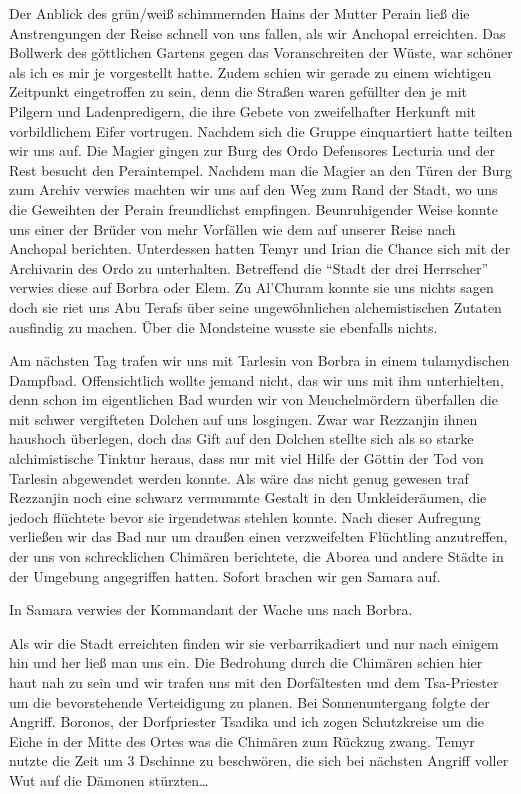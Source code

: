 Der Anblick des grün/weiß schimmernden Hains der Mutter Perain ließ die Anstrengungen der Reise schnell von uns fallen, als wir Anchopal erreichten. Das Bollwerk des göttlichen Gartens gegen das Voranschreiten der Wüste, war schöner als ich es mir je vorgestellt hatte. Zudem schien wir gerade zu einem wichtigen Zeitpunkt eingetroffen zu sein, denn die Straßen waren gefüllter den je mit Pilgern und Ladenpredigern, die ihre Gebete von zweifelhafter Herkunft mit vorbildlichem Eifer vortrugen. Nachdem sich die Gruppe einquartiert hatte teilten wir uns auf. Die Magier gingen zur Burg des Ordo Defensores Lecturia und der Rest besucht den Peraintempel. Nachdem man die Magier an den Türen der Burg zum Archiv verwies machten wir uns auf den Weg zum Rand der Stadt, wo uns die Geweihten der Perain freundlichst empfingen. Beunruhigender Weise konnte uns einer der Brüder von mehr Vorfällen wie dem auf unserer Reise nach Anchopal berichten. Unterdessen hatten Temyr und Irian die Chance sich mit der Archivarin des Ordo zu unterhalten. Betreffend die ``Stadt der drei Herrscher'' verwies diese auf Borbra oder Elem. Zu Al'Churam konnte sie uns nichts sagen doch sie riet uns Abu Terafs über seine ungewöhnlichen alchemistischen Zutaten ausfindig zu machen. Über die Mondsteine wusste sie ebenfalls nichts.

Am nächsten Tag trafen wir uns mit Tarlesin von Borbra in einem tulamydischen Dampfbad. Offensichtlich wollte jemand nicht, das wir uns mit ihm unterhielten, denn schon im eigentlichen Bad wurden wir von Meuchelmördern überfallen die mit schwer vergifteten Dolchen auf uns losgingen. Zwar war Rezzanjin ihnen haushoch überlegen, doch das Gift auf den Dolchen stellte sich als so starke alchimistische Tinktur heraus, dass nur mit viel Hilfe der Göttin der Tod von Tarlesin abgewendet werden konnte. Als wäre das nicht genug gewesen traf Rezzanjin noch eine schwarz vermummte Gestalt in den Umkleideräumen, die jedoch flüchtete bevor sie irgendetwas stehlen konnte. Nach dieser Aufregung verließen wir das Bad nur um draußen einen verzweifelten Flüchtling anzutreffen, der uns von schrecklichen Chimären berichtete, die Aborea und andere Städte in der Umgebung angegriffen hatten. Sofort brachen wir gen Samara auf.

In Samara verwies der Kommandant der Wache uns nach Borbra.

Als wir die Stadt erreichten finden wir sie verbarrikadiert und nur nach einigem hin und her ließ man uns ein. Die Bedrohung durch die Chimären schien hier haut nah zu sein und wir trafen uns mit den Dorfältesten und dem Tsa-Priester um die bevorstehende Verteidigung zu planen. Bei Sonnenuntergang folgte der Angriff. Boronos, der Dorfpriester Tsadika und ich zogen Schutzkreise um die Eiche in der Mitte des Ortes was die Chimären zum Rückzug zwang. Temyr nutzte die Zeit um 3 Dschinne zu beschwören, die sich bei nächsten Angriff voller Wut auf die Dämonen stürzten\dots

